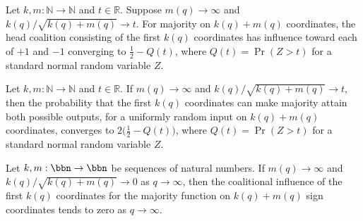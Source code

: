\begin{theorem}
\label{FABL.tendsto_majority_head_directed_influences_totalDimension}
\leanok
{}
Let $k,m:\mathbb{N}\to\mathbb{N}$ and $t\in\mathbb{R}$. Suppose $m(q)\to\infty$ and
$k(q)/\sqrt{k(q)+m(q)}\to t$. For majority on $k(q)+m(q)$ coordinates, the head
coalition consisting of the first $k(q)$ coordinates has influence toward each of $+1$
and $-1$ converging to $\tfrac12-Q(t)$, where $Q(t)=\Pr(Z>t)$ for a standard normal
random variable $Z$.
\end{theorem}

\begin{theorem}
\label{FABL.tendsto_majority_head_total_coalitionalInfluence_totalDimension}
\leanok
{}
Let $k,m:\mathbb{N}\to\mathbb{N}$ and $t\in\mathbb{R}$. If $m(q)\to\infty$ and
$k(q)/\sqrt{k(q)+m(q)}\to t$, then the probability that the first $k(q)$ coordinates can
make majority attain both possible outputs, for a uniformly random input on $k(q)+m(q)$
coordinates, converges to $2\bigl(\tfrac12-Q(t)\bigr)$, where $Q(t)=\Pr(Z>t)$ for a
standard normal random variable $Z$.
\end{theorem}

\begin{theorem}
\label{FABL.tendsto_majority_head_total_coalitionalInfluence_zero_of_subsqrt}
\leanok
{}
Let $k,m:\bbn\to\bbn$ be sequences of natural numbers. If $m(q)\to\infty$ and
$k(q)/\sqrt{k(q)+m(q)}\to 0$ as $q\to\infty$, then the coalitional influence of the
first $k(q)$ coordinates for the majority function on $k(q)+m(q)$ sign coordinates tends
to zero as $q\to\infty$.
\end{theorem}

